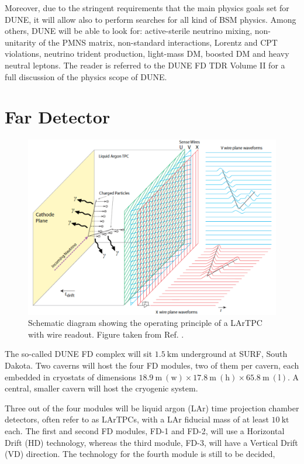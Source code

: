 Moreover, due to the stringent requirements that the main physics goals set for DUNE, it will allow also to perform searches for all kind of BSM physics. Among others, DUNE will be able to look for: active-sterile neutrino mixing, non-unitarity of the PMNS matrix, non-standard interactions, Lorentz and CPT violations, neutrino trident production, light-mass DM, boosted DM and heavy neutral leptons. The reader is referred to the DUNE FD TDR Volume II \cite{DUNE2020TDR2} for a full discussion of the physics scope of DUNE.

\section{Far Detector}

\begin{figure}[t]
	\centering
	\includegraphics[width=0.8\linewidth]{Images/DUNE/FD/tpc}
	\caption[Schematic diagram showing the operating principle of a LArTPC with wire readout]{Schematic diagram showing the operating principle of a LArTPC with wire readout. Figure taken from Ref. \cite{DUNE2020TDR1}.}
	\label{fig:lartpc}
\end{figure}

The so-called DUNE FD complex will sit $1.5~\mathrm{km}$ underground at SURF, South Dakota. Two caverns will host the four FD modules, two of them per cavern, each embedded in cryostats of dimensions $18.9~\mathrm{m} \ (\text{w}) \times 17.8~\mathrm{m} \ (\text{h}) \times 65.8~\mathrm{m} \ (\text{l})$. A central, smaller cavern will host the cryogenic system.

Three out of the four modules will be liquid argon (LAr) time projection chamber detectors, often refer to as LArTPCs, with a LAr fiducial mass of at least $10 \ \mathrm{kt}$ each. The first and second FD modules, FD-1 and FD-2, will use a Horizontal Drift (HD) technology, whereas the third module, FD-3, will have a Vertical Drift (VD) direction. The technology for the fourth module is still to be decided, 

